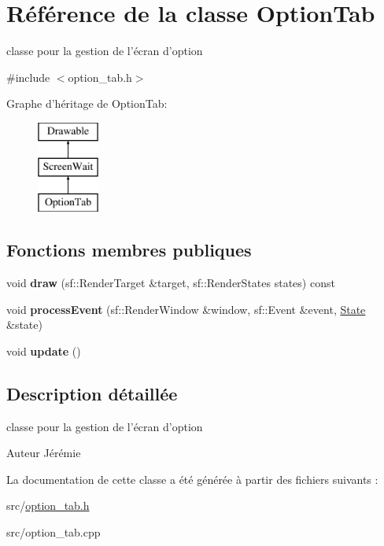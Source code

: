 \hypertarget{class_option_tab}{\section{Référence de la classe Option\+Tab}
\label{class_option_tab}
}


classe pour la gestion de l'écran d'option  




{\ttfamily \#include $<$option\+\_\+tab.\+h$>$}

Graphe d'héritage de Option\+Tab\+:\begin{figure}[H]
\begin{center}
\leavevmode
\includegraphics[height=3.000000cm]{class_option_tab}
\end{center}
\end{figure}
\subsection*{Fonctions membres publiques}
\begin{DoxyCompactItemize}
\item 
\hypertarget{class_option_tab_a7c2f51e828ff318ae9d9390658a17750}{void {\bfseries draw} (sf\+::\+Render\+Target \&target, sf\+::\+Render\+States states) const }\label{class_option_tab_a7c2f51e828ff318ae9d9390658a17750}

\item 
\hypertarget{class_option_tab_a274e9499cd44e2b1950c537cff1c1241}{void {\bfseries process\+Event} (sf\+::\+Render\+Window \&window, sf\+::\+Event \&event, \hyperlink{gamestate_8h_a5d74787dedbc4e11c1ab15bf487e61f8}{State} \&state)}\label{class_option_tab_a274e9499cd44e2b1950c537cff1c1241}

\item 
\hypertarget{class_option_tab_a80a643fddbc013ad1e77bff4c4ec7000}{void {\bfseries update} ()}\label{class_option_tab_a80a643fddbc013ad1e77bff4c4ec7000}

\end{DoxyCompactItemize}


\subsection{Description détaillée}
classe pour la gestion de l'écran d'option 

\begin{DoxyAuthor}{Auteur}
Jérémie 
\end{DoxyAuthor}


La documentation de cette classe a été générée à partir des fichiers suivants \+:\begin{DoxyCompactItemize}
\item 
src/\hyperlink{option__tab_8h}{option\+\_\+tab.\+h}\item 
src/option\+\_\+tab.\+cpp\end{DoxyCompactItemize}
